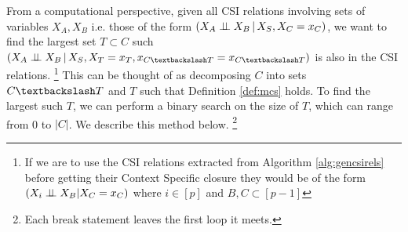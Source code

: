 \documentclass{tufte-book}
\begin{document}
From a computational perspective, given all CSI relations involving sets of variables \(X_A,X_B\) i.e. those of the form \((X_A \perp \!\!\! \perp X_B \,|\, X_S, X_C=x_C)\), we want to find the largest set \(T \subset C\) such \((X_A \indep X_B \,|\, X_S, X_T=x_T, x_{C \textbackslash T} = x_{C \textbackslash T})\) is also in the CSI relations.  \footnote{If we are to use the CSI relations extracted from Algorithm \ref{alg:gencsirels} before getting their Context Specific closure they would be of the form $(X_i \perp \!\!\! \perp X_B | X_C=x_C)$ where $i \in [p]$ and $B ,C \subset [p-1]$}  This can be thought of as decomposing \(C\) into sets \(C \textbackslash T\) and \(T\) such that Definition \ref{def:mcs} holds. To find the largest such \(T\), we can perform a binary search on the size of \(T\), which can range from 0 to \(|C|\).
We describe this method below.  \footnote{Each break statement leaves the first loop it meets.} 
\end{document}
